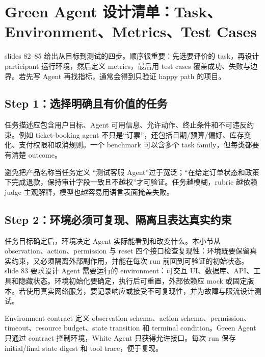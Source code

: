 \section{Green Agent 设计清单：Task、Environment、Metrics、Test Cases}

slides 82--85 给出从目标到测试的四步。顺序很重要：先选要评价的 task，再设计 participant 运行环境，然后定义 metrics，最后用 test cases 覆盖成功、失败与边界。若先写 Agent 再找指标，通常会得到只验证 happy path 的项目。

\subsection{Step 1：选择明确且有价值的任务}

任务描述应包含用户目标、Agent 可用信息、允许动作、终止条件和不可违反约束。例如 ticket-booking agent 不只是“订票”，还包括日期/预算/偏好、库存变化、支付权限和取消规则。一个 benchmark 可以含多个 task family，但每类都要有清楚 outcome。


\begin{warningbox}{避免把产品名称当任务定义}
“测试客服 Agent”过于宽泛；“在给定订单状态和政策下完成退款，保持审计字段一致且不越权”才可验证。任务越模糊，rubric 越依赖 judge 主观解释，模型也越容易用语言表面掩盖失败。
\end{warningbox}

\subsection{Step 2：环境必须可复现、隔离且表达真实约束}

任务目标确定后，环境决定 Agent 实际能看到和改变什么。本小节从 observation、action、permission 与 reset 四个接口检查复现性：环境既要保留真实约束，又必须隔离外部副作用，并能在每次 run 前回到可验证的初始状态。
slide 83 要求设计 Agent 需要运行的 environment：可交互 UI、数据库、API、工具和隐藏状态。环境初始化要确定，执行后可重置，外部依赖应 mock 或固定版本。若使用真实网络服务，要记录响应或接受不可复现性，并为故障与限流设计测试。


\begin{knowledgebox}{Environment contract}
定义 observation schema、action schema、permission、timeout、resource budget、state transition 和 terminal condition。Green Agent 只通过 contract 控制环境，White Agent 只获得允许接口。每次 run 保存 initial/final state digest 和 tool trace，便于复现。
\end{knowledgebox}

